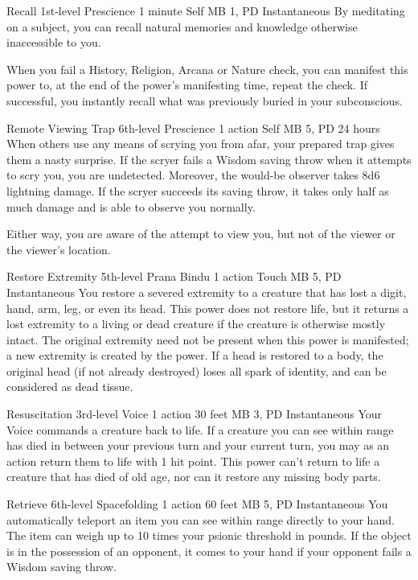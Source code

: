 \DndPowerHeader%
  {Recall}
  {1st-level Prescience}
  {1 minute}
  {Self}
  {MB 1, PD \lvlone}
  {Instantaneous}
By meditating on a subject, you can recall
natural memories and knowledge otherwise inaccessible to you.

When you fail a History, Religion, Arcana or Nature check,
you can manifest this power to, at the end of the
power's manifesting time, repeat the check.
If successful, you instantly recall
what was previously buried in your subconscious.

\DndPowerHeader%
  {Remote Viewing Trap}
  {6th-level Prescience}
  {1 action}
  {Self}
  {MB 5, PD \lvlsix}
  {24 hours}
When others use any means of scrying you from afar,
your prepared trap gives them a nasty surprise.
If the scryer fails a Wisdom saving throw
when it attempts to scry you,
you are undetected.
Moreover, the would-be observer takes 8d6 lightning damage.
If the scryer succeeds its saving throw,
it takes only half as much damage
and is able to observe you normally.

Either way, you are aware of the attempt to view you,
but not of the viewer or the viewer's location.

\DndPowerHeader%
  {Restore Extremity}
  {5th-level Prana Bindu}
  {1 action}
  {Touch}
  {MB 5, PD \lvlfive}
  {Instantaneous}
You restore a severed extremity to a creature that has
lost a digit, hand, arm, leg,
or even its head.
This power does not restore life,
but it returns a lost extremity to a living or dead creature
if the creature is otherwise mostly intact.
The original extremity need not be present
when this power is manifested;
a new extremity is created by the power.
If a head is restored to a body,
the original head (if not already destroyed)
loses all spark of identity,
and can be considered as dead tissue.

\DndPowerHeader%
  {Resuscitation}
  {3rd-level Voice}
  {1 action}
  {30 feet}
  {MB 3, PD \lvlthree}
  {Instantaneous}
Your Voice commands a creature back to life.
If a creature you can see within range
has died in between your previous turn
and your current turn,
you may as an action return them to life
with 1 hit point.
This power can't return to life a creature
that has died of old age,
nor can it restore any missing body parts.

\DndPowerHeader%
  {Retrieve}
  {6th-level Spacefolding}
  {1 action}
  {60 feet}
  {MB 5, PD \lvlsix}
  {Instantaneous}
You automatically teleport an item you can see within range
directly to your hand.
The item can weigh up to
10 times your psionic threshold in pounds.
If the object is in the possession of an opponent,
it comes to your hand if your opponent
fails a Wisdom saving throw.

